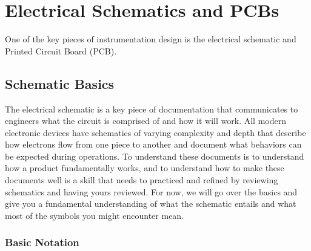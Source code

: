 %

\chapter{Electrical Schematics and PCBs}
\setchapterpreamble[u]{\margintoc}

One of the key pieces of instrumentation design is the electrical schematic and Printed Circuit Board (PCB).

\section{Schematic Basics}
The electrical schematic is a key piece of documentation that communicates to engineers what the circuit is comprised of and how it will work.
All modern electronic devices have schematics of varying complexity and depth that describe how electrons flow from one piece to another and document what behaviors can be expected during operations.
To understand these documents is to understand how a product fundamentally works, and to understand how to make these documents well is a skill that needs to practiced and refined by reviewing schematics and having yours reviewed.
For now, we will go over the basics and give you a fundamental understanding of what the schematic entails and what most of the symbols you might encounter mean.

    \subsection{Basic Notation}
    